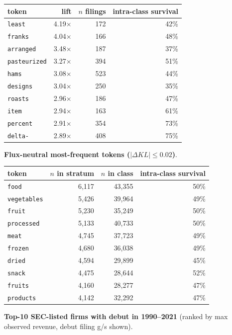 \begin{tabular}{lrrr}
\toprule
token & lift & $n$ filings & intra-class survival \\
\midrule
\texttt{least} & 4.19$\times$ & 172 & 42\% \\
\texttt{franks} & 4.04$\times$ & 166 & 48\% \\
\texttt{arranged} & 3.48$\times$ & 187 & 37\% \\
\texttt{pasteurized} & 3.27$\times$ & 394 & 51\% \\
\texttt{hams} & 3.08$\times$ & 523 & 44\% \\
\texttt{designs} & 3.04$\times$ & 250 & 35\% \\
\texttt{roasts} & 2.96$\times$ & 186 & 47\% \\
\texttt{item} & 2.94$\times$ & 163 & 61\% \\
\texttt{percent} & 2.91$\times$ & 354 & 73\% \\
\texttt{delta-} & 2.89$\times$ & 408 & 75\% \\
\bottomrule
\end{tabular}

\textbf{Flux-neutral most-frequent tokens ($|\Delta KL|\leq 0.02$)}.

\begin{tabular}{lrrr}
\toprule
token & $n$ in stratum & $n$ in class & intra-class survival \\
\midrule
\texttt{food} & 6,117 & 43,355 & 50\% \\
\texttt{vegetables} & 5,426 & 39,964 & 49\% \\
\texttt{fruit} & 5,230 & 35,249 & 50\% \\
\texttt{processed} & 5,133 & 40,733 & 50\% \\
\texttt{meat} & 4,745 & 37,723 & 49\% \\
\texttt{frozen} & 4,680 & 36,038 & 49\% \\
\texttt{dried} & 4,594 & 29,899 & 45\% \\
\texttt{snack} & 4,475 & 28,644 & 52\% \\
\texttt{fruits} & 4,160 & 28,277 & 47\% \\
\texttt{products} & 4,142 & 32,292 & 47\% \\
\bottomrule
\end{tabular}

\textbf{Top-10 SEC-listed firms with debut in 1990--2021} (ranked by max observed revenue, debut filing g/s shown).

